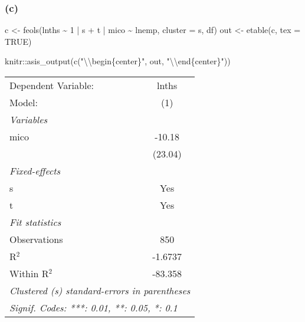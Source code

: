 \documentclass[
]{article}
\newenvironment{Shaded}{\begin{snugshade}}{\end{snugshade}}
\newcommand{\AttributeTok}[1]{\textcolor[rgb]{0.77,0.63,0.00}{#1}}
\newcommand{\ConstantTok}[1]{\textcolor[rgb]{0.00,0.00,0.00}{#1}}
\newcommand{\DecValTok}[1]{\textcolor[rgb]{0.00,0.00,0.81}{#1}}
\newcommand{\FunctionTok}[1]{\textcolor[rgb]{0.00,0.00,0.00}{#1}}
\newcommand{\NormalTok}[1]{#1}
\newcommand{\OtherTok}[1]{\textcolor[rgb]{0.56,0.35,0.01}{#1}}
\newcommand{\SpecialCharTok}[1]{\textcolor[rgb]{0.00,0.00,0.00}{#1}}
\newcommand{\StringTok}[1]{\textcolor[rgb]{0.31,0.60,0.02}{#1}}
\begin{document}
\hypertarget{c-2}{%
\subsubsection{(c)}\label{c-2}}

\begin{Shaded}
\begin{Highlighting}[]
\NormalTok{c }\OtherTok{\textless{}{-}} \FunctionTok{feols}\NormalTok{(lnths }\SpecialCharTok{\textasciitilde{}} \DecValTok{1} \SpecialCharTok{|}\NormalTok{ s }\SpecialCharTok{+}\NormalTok{ t }\SpecialCharTok{|}\NormalTok{ mico }\SpecialCharTok{\textasciitilde{}}\NormalTok{ lnemp, }\AttributeTok{cluster =} \StringTok{\textquotesingle{}s\textquotesingle{}}\NormalTok{, df)}
\NormalTok{out }\OtherTok{\textless{}{-}} \FunctionTok{etable}\NormalTok{(c, }\AttributeTok{tex =} \ConstantTok{TRUE}\NormalTok{) }
\end{Highlighting}
\end{Shaded}

\begin{Shaded}
\begin{Highlighting}[]
\NormalTok{knitr}\SpecialCharTok{::}\FunctionTok{asis\_output}\NormalTok{(}\FunctionTok{c}\NormalTok{(}\StringTok{"}\SpecialCharTok{\textbackslash{}\textbackslash{}}\StringTok{begin\{center\}"}\NormalTok{, out, }\StringTok{"}\SpecialCharTok{\textbackslash{}\textbackslash{}}\StringTok{end\{center\}"}\NormalTok{)) }
\end{Highlighting}
\end{Shaded}

\begin{center}\begingroup\centering\begin{tabular}{lc}   \tabularnewline \midrule \midrule   Dependent Variable: & lnths\\     Model:              & (1)\\     \midrule   \emph{Variables}\\   mico                & -10.18\\                          & (23.04)\\      \midrule   \emph{Fixed-effects}\\   s                   & Yes\\     t                   & Yes\\     \midrule   \emph{Fit statistics}\\   Observations        & 850\\     R$^2$               & -1.6737\\     Within R$^2$        & -83.358\\     \midrule \midrule   \multicolumn{2}{l}{\emph{Clustered (s) standard-errors in parentheses}}\\   \multicolumn{2}{l}{\emph{Signif. Codes: ***: 0.01, **: 0.05, *: 0.1}}\\\end{tabular}\par\endgroup\end{center}
\end{document}
